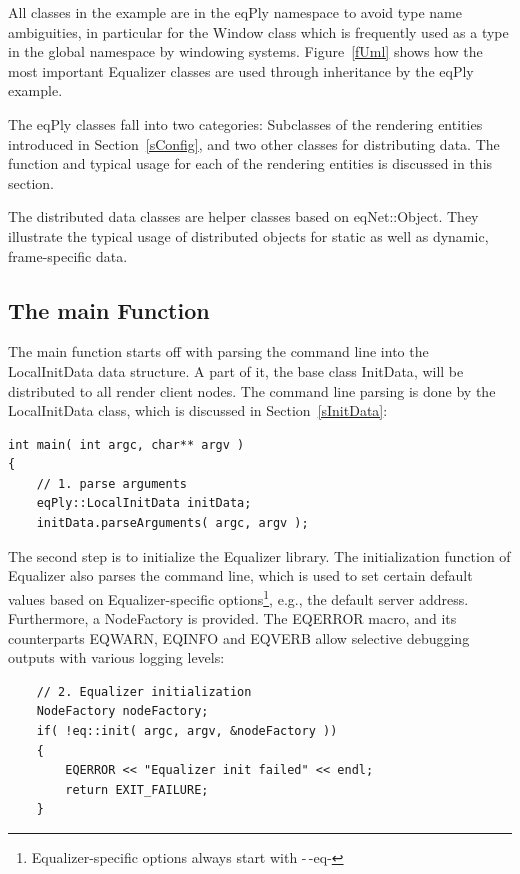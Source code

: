 \documentclass[10pt,a4]{scrartcl}
\newcommand{\fig}[1]{Figure~\ref{#1}}
\newcommand{\sref}[1]{Section~\ref{#1}}
\begin{document}
All classes in the example are in the \textsf{eqPly} namespace to avoid
type name ambiguities, in particular for the \textsf{Window} class which
is frequently used as a type in the global namespace by windowing
systems. \fig{fUml} shows how the most important Equalizer classes are
used through inheritance by the \textsf{eqPly} example.

The \textsf{eqPly} classes fall into two categories: Subclasses of the
rendering entities introduced in \sref{sConfig}, and two other classes
for distributing data. The function and typical usage for each of the
rendering entities is discussed in this section. 

The distributed data classes are helper classes based on
\textsf{eqNet::Object}. They illustrate the typical usage of distributed
objects for static as well as dynamic, frame-specific data.


\subsection{The main Function}

The main function starts off with parsing the command line into the
\textsf{LocalInitData} data structure. A part of it, the base class
\textsf{InitData}, will be distributed to all render client nodes. The
command line parsing is done by the \textsf{LocalInitData} class, which
is discussed in \sref{sInitData}:

{\footnotesize\begin{lstlisting}
int main( int argc, char** argv )
{
    // 1. parse arguments
    eqPly::LocalInitData initData;
    initData.parseArguments( argc, argv );
\end{lstlisting}}

The second step is to initialize the Equalizer library. The
initialization function of Equalizer also parses the command line, which
is used to set certain default values based on Equalizer-specific
options\footnote{Equalizer-specific options always start with -\,-eq-},
e.g., the default server address. Furthermore, a \textsf{NodeFactory} is
provided. The \textsf{EQERROR} macro, and its counterparts
\textsf{EQWARN}, \textsf{EQINFO} and \textsf{EQVERB} allow selective
debugging outputs with various logging levels:

{\footnotesize\begin{lstlisting}
    // 2. Equalizer initialization
    NodeFactory nodeFactory;
    if( !eq::init( argc, argv, &nodeFactory ))
    {
        EQERROR << "Equalizer init failed" << endl;
        return EXIT_FAILURE;
    }
\end{lstlisting}}%
\end{document}
